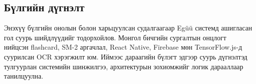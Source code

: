 \subsection{Бүлгийн дүгнэлт}

Энэхүү бүлгийн онолын болон харьцуулсан судалгаагаар Egüü системд ашигласан гол суурь шийдлүүдийг тодорхойлов. Монгол бичгийн сургалтын онцлогт нийцсэн flashcard, SM-2 аргачлал, React Native, Firebase мөн TensorFlow.js-д суурилсан OCR хэрэгжилт юм. Иймээс дараагийн бүлэгт эдгээр суурь дүгнэлтэд тулгуурлан системийн шинжилгээ, архитектурын зохиомжийг логик дарааллаар танилцуулна.

\vfill
